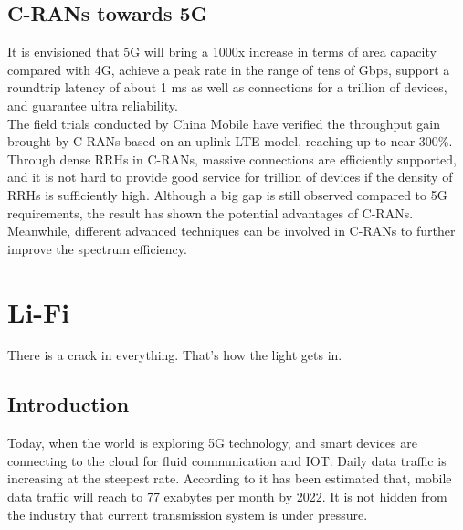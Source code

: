 \documentclass[notitlepage,hidelinks]{article}
\begin{document}


\subsection{C-RANs towards 5G}\nocite{peng16}


It is envisioned that 5G will bring a 1000x increase in terms 
of area capacity compared with 4G, achieve a peak rate in
the range of tens of Gbps, support a roundtrip latency of
about 1 ms as well as connections for a trillion of devices,
and guarantee ultra reliability.\\

The field trials conducted by China Mobile have verified the
throughput gain brought by C-RANs based on an uplink LTE model,
reaching up to near 300\%. Through dense RRHs in C-RANs,
massive connections are efficiently supported, and it is not
hard to provide good service for trillion of devices if the
density of RRHs is sufficiently high. Although a big gap
is still observed compared to 5G requirements, the result
has shown the potential advantages of C-RANs. Meanwhile,
different advanced techniques can be involved in C-RANs to
further improve the spectrum efficiency.


\printbibliography[heading=subbibliography]




\newpage
\section{Li-Fi}

\epigraph{There is a crack in everything.
That's how the light gets in.}{\parencite{selected-poem}}



\subsection{Introduction}

Today, when the world is exploring 5G technology, and smart devices are
connecting to the cloud for fluid communication and IOT.  Daily data traffic is
increasing at the steepest rate. According to \textcite{cisco19} it has been
estimated that, mobile data traffic will reach to 77 exabytes per month by
2022. It is not hidden from the industry that current transmission system is
under pressure.\\
\end{document}
